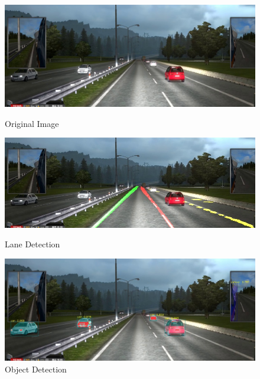 \documentclass[runningheads]{llncs}
\begin{document}
\begin{figure}[!htb]
	\includegraphics[width=\linewidth]{result/w000066.jpg}
	\caption{Original Image}\label{fig:Original_Image}
	\endminipage\hfill
	\includegraphics[width=\linewidth]{result/w000066-lane.jpg}
	\caption{Lane Detection}\label{fig:Lane_Line_Result}
	\endminipage\hfill
	\includegraphics[width=\linewidth]{result/w000066-obj.jpg}
	\caption{Object Detection}\label{fig:Object_result}
	\endminipage
\end{figure}
\end{document}
